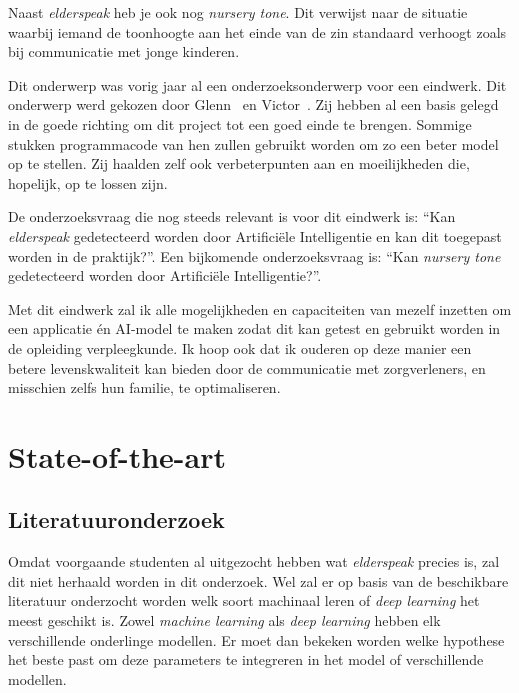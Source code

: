 Naast \textit{elderspeak} heb je ook nog \textit{nursery tone}. Dit verwijst naar de situatie waarbij iemand de toonhoogte aan het einde van de zin standaard verhoogt zoals bij communicatie met jonge kinderen.

Dit onderwerp was vorig jaar al een onderzoeksonderwerp voor een eindwerk.
Dit onderwerp werd gekozen door Glenn~\textcite{Beeckman2021} en Victor~\textcite{Standaert2021}.
Zij hebben al een basis gelegd in de goede richting om dit project tot een goed einde te brengen.
Sommige stukken programmacode van hen zullen gebruikt worden om zo een beter model op te stellen.
Zij haalden zelf ook verbeterpunten aan en moeilijkheden die, hopelijk, op te lossen zijn.

De onderzoeksvraag die nog steeds relevant is voor dit eindwerk is: ``Kan \textit{elderspeak} gedetecteerd worden door Artificiële Intelligentie en kan dit toegepast worden in de praktijk?''. Een bijkomende onderzoeksvraag is: ``Kan \textit{nursery tone} gedetecteerd worden door Artificiële Intelligentie?''.

Met dit eindwerk zal ik alle mogelijkheden en capaciteiten van mezelf inzetten om een applicatie én AI-model te maken zodat dit kan getest en gebruikt worden in de opleiding verpleegkunde.
Ik hoop ook dat ik ouderen op deze manier een betere levenskwaliteit kan bieden door de communicatie met zorgverleners, en misschien zelfs hun familie, te optimaliseren.



\section{State-of-the-art}
\label{sec:state-of-the-art}

\subsection{Literatuuronderzoek}\label{subsec:literatuuronderzoek}

Omdat voorgaande studenten al uitgezocht hebben wat \textit{elderspeak} precies is, zal dit niet herhaald worden in dit onderzoek.
Wel zal er op basis van de beschikbare literatuur onderzocht worden welk soort machinaal leren of \textit{deep learning} het meest geschikt is. Zowel \textit{machine learning} als \textit{deep learning} hebben elk verschillende onderlinge modellen. Er moet dan bekeken worden welke hypothese het beste past om deze parameters te integreren in het model of verschillende modellen.

